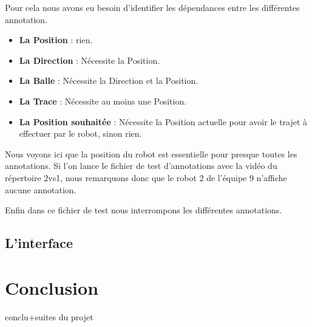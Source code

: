 \documentclass[a4paper,12pt]{report}
\begin{document}
Pour cela nous avons eu besoin d'identifier les dépendances entre les différentes annotation.

\begin{itemize}
    \item \textbf{La Position } : rien.
    \item \textbf{La Direction }: Nécessite la Position.
    \item \textbf{La Balle }: Nécessite la Direction et la Position.
    \item \textbf{La Trace }: Nécessite au moins une Position.
    \item \textbf{La Position souhaitée } : Nécessite la Position actuelle pour avoir le trajet à effectuer par le robot, sinon rien.
\end{itemize}

Nous voyons ici que la position du robot est essentielle pour presque toutes les annotations. Si l'on lance le fichier de test d'annotations avec la vidéo du répertoire 2vs1, nous remarquons donc que le robot 2 de l'équipe 9 n'affiche aucune annotation.

Enfin dans ce fichier de test nous interrompons les différentes annotations. 



\section{L'interface}


\chapter{Conclusion}

conclu+suites du projet

\newpage

\printbibliography

\newpage
\end{document}
